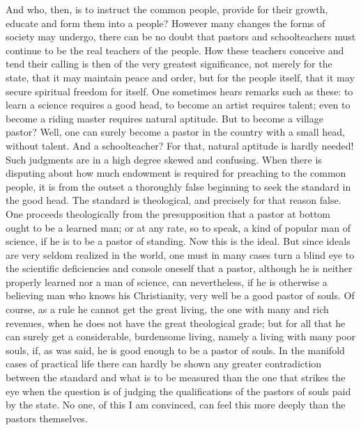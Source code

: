 \documentclass[12pt]{book}
\newcommand{\opage}[1]{\marginnote{\footnotesize\textit{[#1]}}}
\begin{document}
And who, then, is to instruct the common people, provide for their growth,
educate and form them into a people? However many changes the forms of
society may undergo, there can
\opage{289}\setcounter{footnote}{0}%
be no doubt that pastors and schoolteachers must continue to be the real
teachers of the people. How these teachers conceive and tend their calling
is then of the very greatest significance, not merely for the state, that
it may maintain peace and order, but for the people itself, that it may
secure spiritual freedom for itself. One sometimes hears remarks such as
these: to learn a science requires a good head, to become an artist
requires talent; even to become a riding master requires natural
aptitude. But to become a village pastor? Well, one can surely become a
pastor in the country with a small head, without talent. And a
schoolteacher? For that, natural aptitude is hardly needed! Such
judgments are in a high degree skewed and confusing. When there is
disputing about how much endowment is required for preaching to the
common people, it is from the outset a thoroughly false beginning to seek
the standard in the good head. The standard is theological, and precisely
for that reason false. One proceeds theologically from the presupposition
that a pastor at bottom ought to be a learned man; or at any rate, so to
speak, a kind of popular man of science, if he is to be a pastor of
standing. Now this is the ideal. But since ideals are very seldom realized
in the world, one must in many cases turn a blind eye to the scientific
deficiencies and console oneself that a pastor, although he is neither
properly learned nor a man of science, can nevertheless, if he is
otherwise a believing man who knows his Christianity, very well be a good
pastor of souls. Of course, as a rule he cannot get the great living, the
one with many and rich revenues, when he does not have the great
theological grade; but for all that he can surely get a considerable,
burdensome living, namely a living with many poor souls, if, as was said,
he is good enough to be a pastor of souls. In the manifold
\opage{290}\setcounter{footnote}{0}%
cases of practical life there can hardly be shown any greater
contradiction between the standard and what is to be measured than the one
that strikes the eye when the question is of judging the qualifications of
the pastors of souls paid by the state. No one, of this I am convinced,
can feel this more deeply than the pastors themselves.
\end{document}
